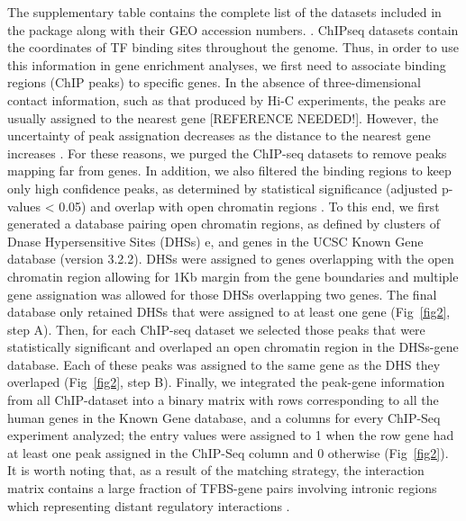 \documentclass[10pt,letterpaper]{article}
\begin{document}
	The supplementary table  contains the complete list of the datasets included in the package along with their GEO accession numbers. .  
	ChIPseq datasets contain the coordinates of TF binding sites throughout the genome. Thus, in order to use this information in gene enrichment analyses, we first need to associate binding regions (ChIP peaks) to specific genes. In the absence of three-dimensional contact information, such as that produced by Hi-C experiments, the peaks are usually assigned to the nearest gene [REFERENCE NEEDED!]. However, the uncertainty of peak assignation decreases as the distance to the nearest gene increases \cite{Mifsud2015}. For these reasons, we purged the ChIP-seq datasets to remove peaks mapping far from genes. In addition, we also filtered the binding regions to keep only high confidence peaks, as determined by statistical significance (adjusted p-values < 0.05) and overlap with open chromatin regions \cite{EncodeDHS2}. To this end, we first generated a database pairing open chromatin regions, as defined by clusters of Dnase Hypersensitive Sites (DHSs) e\cite{EncodeDHS1}\cite{EncodeDHS2}, and genes in the UCSC Known Gene database (version 3.2.2)\cite{KnownGene}. DHSs were assigned to genes overlapping with the open chromatin region allowing for 1Kb margin from the gene boundaries and multiple gene assignation was allowed for those DHSs overlapping two genes. The final database only retained DHSs that were assigned to at least one gene (Fig~\ref{fig2}, step A). Then, for each ChIP-seq dataset we selected those peaks that were statistically significant and overlaped an open chromatin region in the DHSs-gene database. Each of these peaks was assigned to the same gene as the DHS they overlaped (Fig~\ref{fig2}, step B). Finally, we integrated the peak-gene information from all ChIP-dataset into a binary matrix with rows corresponding to all the human genes in the Known Gene database, and a columns for every ChIP-Seq experiment analyzed; the entry values were assigned to 1 when the row gene had at least one peak assigned in the ChIP-Seq column and 0 otherwise (Fig~\ref{fig2}). It is worth noting that, as a result of the matching strategy, the interaction matrix contains a large fraction of TFBS-gene pairs involving intronic regions which representing distant regulatory interactions \cite{Mifsud2015}.
	
\end{document}
